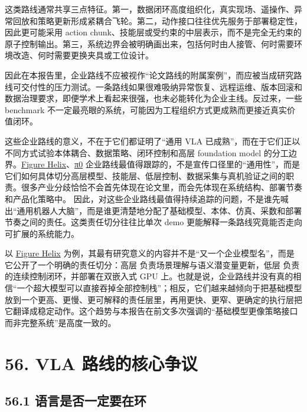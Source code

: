 这类路线通常共享三点特征。第一，数据闭环高度组织化，真实现场、遥操作、异常回放和策略更新形成紧耦合飞轮。第二，动作接口往往优先服务于部署稳定性，因此更可能采用 action chunk、技能层或受约束的中层表示，而不是完全无约束的原子控制输出。第三，系统边界会被明确画出来，包括何时由人接管、何时需要环境改造、何时需要更换夹具或工位设计。

因此在本报告里，企业路线不应被视作“论文路线的附属案例”，而应被当成研究路线可交付性的压力测试。一条路线如果很难吸纳异常恢复、远程运维、版本回滚和数据治理要求，即便学术上看起来很强，也未必能转化为企业主线。反过来，一些 benchmark 不一定最亮眼的系统，可能因为工程组织方式更成熟而更接近真实价值闭环。

这些企业路线的意义，不在于它们都证明了“通用 VLA 已成熟”，而在于它们正以不同方式试验本体耦合、数据策略、闭环控制和高层 foundation model 的分工边界。\href{https://www.figure.ai/news/helix}{Figure Helix}、\href{https://www.pi.website/blog/pi0}{π0} 企业路线最值得跟踪的，不是宣传口径里的“通用性”，而是它们如何具体切分高层模型、技能层、低层控制、数据采集与真机验证之间的职责。很多产业分歧恰恰不会首先体现在论文里，而会先体现在系统结构、部署节奏和产品化策略中。 因此，对这些企业路线最值得持续追踪的问题，不是谁先喊出“通用机器人大脑”，而是谁更清楚地分配了基础模型、本体、仿真、采数和部署节奏之间的责任。这类责任切分往往比单次 demo 更能解释一条路线究竟能否走向可扩展的系统能力。

以 \href{https://www.figure.ai/news/helix}{Figure Helix} 为例，其最有研究意义的内容并不是“又一个企业模型名”，而是它公开了一个明确的责任切分：高层 \texttt{} 负责场景理解与语义潜变量更新，低层 \texttt{} 负责 \texttt{} 的连续控制闭环，并部署在双嵌入式 GPU 上。也就是说，企业路线并没有真的相信“一个超大模型可以直接吞掉全部控制栈”；相反，它们越来越倾向于把基础模型放到一个更高、更慢、更可解释的责任层里，再用更快、更窄、更确定的执行层把它翻译成稳定动作。这个趋势与本报告在前文多次强调的“基础模型更像策略接口而非完整系统”是高度一致的。

\chapter*{56. VLA 路线的核心争议}

\section*{56.1 语言是否一定要在环}


